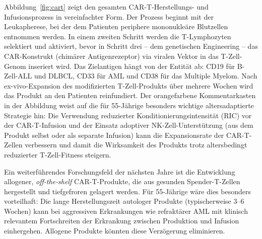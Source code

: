﻿\documentclass[12pt,a4paper]{article}
\theoremstyle{definition}
\begin{document}
Abbildung~\ref{fig:cart} zeigt den gesamten CAR-T-Herstellungs- und Infusionsprozess
in vereinfachter Form. Der Prozess beginnt mit der Leukapherese, bei der dem Patienten
periphere mononukleäre Blutzellen entnommen werden. In einem zweiten Schritt werden
die T-Lymphozyten selektiert und aktiviert, bevor in Schritt drei -- dem genetischen
Engineering -- das CAR-Konstrukt (chimärer Antigenrezeptor) via viralen Vektor
in das T-Zell-Genom inseriert wird. Das Zielantigen hängt von der Entität ab: CD19
für B-Zell-ALL und DLBCL, CD33 für AML und CD38 für das Multiple Myelom. Nach
ex-vivo-Expansion des modifizierten T-Zell-Produkts über mehrere Wochen wird das
Produkt an den Patienten reinfundiert. Der orangefarbene Kommentarkasten in der
Abbildung weist auf die für 55-Jährige besonders wichtige altersadaptierte
Strategie hin: Die Verwendung reduzierter Konditionierungsintensität (RIC) vor
der CAR-T-Infusion und der Einsatz adoptiver NK-Zell-Unterstützung (aus dem
Produkt selbst oder als separate Infusion) kann die Expansionsrate der CAR-T-Zellen
verbessern und damit die Wirksamkeit des Produkts trotz altersbedingt reduzierter
T-Zell-Fitness steigern.

Ein weiterführendes Forschungsfeld der nächsten Jahre ist die Entwicklung
allogener, \emph{off-the-shelf} CAR-T-Produkte, die aus gesunden Spender-T-Zellen
hergestellt und tiefgefroren gelagert werden. Für 55-Jährige wäre dies besonders
vorteilhaft: Die lange Herstellungszeit autologer Produkte (typischerweise 3--6 Wochen)
kann bei aggressiven Erkrankungen wie refraktärer AML mit klinisch relevantem Fortschreiten
der Erkrankung zwischen Produktion und Infusion einhergehen. Allogene Produkte könnten
diese Verzögerung eliminieren.
\end{document}
